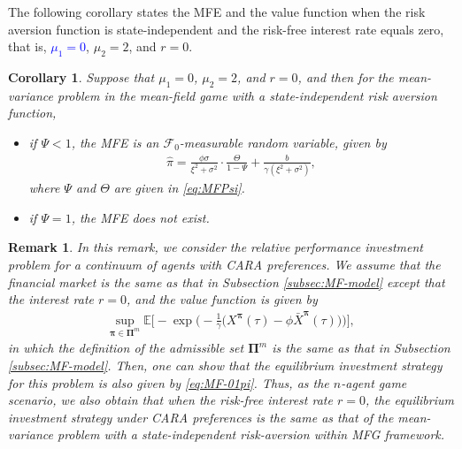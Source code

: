 \documentclass[11pt]{article}
\newtheorem{corollary}{Corollary}[section]
\newtheorem{remark}{Remark}[section]
\newcommand \E {\mathbb{E}}
\numberwithin{equation}{section}
\newcommand{\blue}[1]{\textcolor{blue}{#1}}
\newcommand{\bpi}{\boldsymbol{\pi}}
\begin{document}
	The following corollary states the MFE and the value function when the risk aversion function is state-independent and the risk-free interest rate equals zero, that is, \blue{\(\mu_{1}=0\)}, \(\mu_{2}=2\), and \(r = 0\).
	\begin{corollary}\label{cor:MF-020}
		Suppose that \(\mu_{1}=0\), \(\mu_{2}=2\), and \(r=0\),
		and then for the mean-variance problem in the mean-field game with a state-independent risk aversion function,
		\begin{itemize}
			\item[$(1)$] if \(\Psi<1\), the MFE is an $\mathcal{F}_0$-measurable random variable, given by
			\begin{align}\label{eq:MF-01pi}
				\widehat{\pi}=\frac{\phi\sigma}{\xi^2+\sigma^2}\cdot \frac{\Theta}{1-\Psi}+\frac{b}{\gamma(\xi^2+\sigma^2)},
			\end{align}		
			where \(\Psi\) and \(\Theta\) are given in \eqref{eq:MFPsi}.
			\item[$(2)$] if  \(\Psi=1\), the MFE does not exist.
		\end{itemize}
	\end{corollary}
	\begin{remark}
		In this remark, we consider the relative performance investment problem for a continuum of agents with CARA preferences. We assume that the financial market is the same as that in Subsection  \ref{subsec:MF-model} except that the interest rate \(r = 0\), and the value function is given by
		\begin{align}
			\sup_{\bpi\in\bm{\Pi}^{\scriptscriptstyle m}}\E\Bigg[-\exp\Bigg(-\frac{1}{\gamma}\Big(X^{\bpi}(\tau)-\phi\bar{X}^{\bpi}(\tau)\Big)\Bigg)\Bigg],
		\end{align}
		in which the definition of the admissible set $\bm{\Pi}^m$ is the same as that in Subsection \ref{subsec:MF-model}.
		Then, one can show that the equilibrium investment strategy for this problem is also given by \eqref{eq:MF-01pi}.
		Thus, as the $n$-agent game scenario, we also obtain that when the risk-free interest rate $r=0$, the equilibrium investment strategy under CARA preferences is the same as that of the mean-variance problem with a state-independent risk-aversion within MFG framework.
	\end{remark}
	
	
	
	
\end{document}
